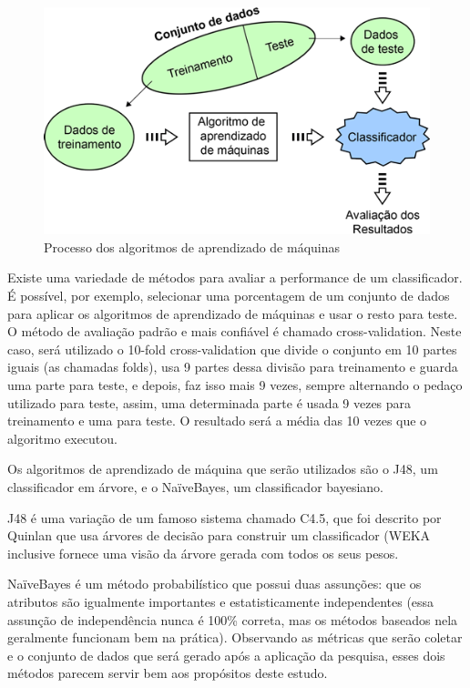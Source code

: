\begin{figure}[h]
	\centering
	\includegraphics[scale=0.7]{figs/training-datasets-pequeno.png}
	\caption{\label{fig_1}Processo dos algoritmos de aprendizado de máquinas}
\end{figure}

Existe uma variedade de métodos para avaliar a performance de um classificador. É possível, por exemplo, selecionar uma porcentagem de um conjunto de dados para aplicar os algoritmos de aprendizado de máquinas e usar o resto para teste. O método de avaliação padrão e mais confiável é chamado cross-validation. Neste caso, será utilizado o 10-fold cross-validation que divide o conjunto em 10 partes iguais (as chamadas folds), usa 9 partes dessa divisão para treinamento e guarda uma parte para teste, e depois, faz isso mais 9 vezes, sempre alternando o pedaço utilizado para teste, assim, uma determinada parte é usada 9 vezes para treinamento e uma para teste. O resultado será a média das 10 vezes que o algoritmo executou.

Os algoritmos de aprendizado de máquina que serão utilizados são o J48, um classificador em árvore, e o NaïveBayes, um classificador bayesiano.

J48 é uma variação de um famoso sistema chamado C4.5, que foi descrito por Quinlan \cite{Quinlan1993} que usa árvores de decisão para construir um classificador (WEKA inclusive fornece uma visão da árvore gerada com todos os seus pesos.

NaïveBayes é um método probabilístico que possui duas assunções: que os atributos são igualmente importantes e estatisticamente independentes (essa assunção de independência nunca é 100\% correta, mas os métodos baseados nela geralmente funcionam bem na prática). Observando as métricas que serão coletar e o conjunto de dados que será gerado após a aplicação da pesquisa, esses dois métodos parecem servir bem aos propósitos deste estudo.

